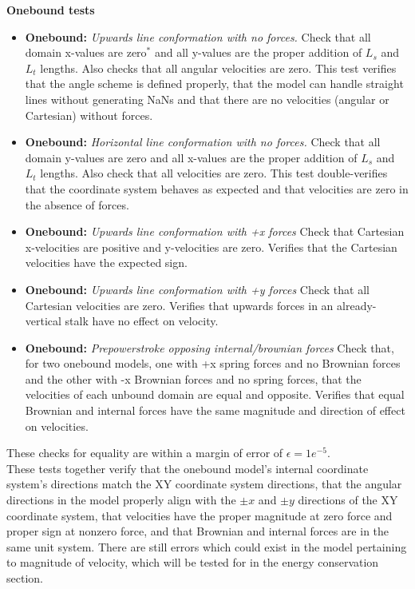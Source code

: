 \documentclass[
11pt, %
english, %
singlespacing, %
headsepline, %
chapterinoneline, %
]{MastersDoctoralThesis} %
\begin{document}
\textbf{Onebound tests}
\begin{itemize}
\item \textbf{Onebound:} \textit{Upwards line conformation with no forces.} Check that all domain x-values are zero$^*$ and all y-values are the proper addition of $L_s$ and $L_t$ lengths. Also checks that all angular velocities are zero. This test verifies that the angle scheme is defined properly, that the model can handle straight lines without generating NaNs and that there are no velocities (angular or Cartesian) without forces.
\item \textbf{Onebound:} \textit{Horizontal line conformation with no forces.} Check that all domain y-values are zero and all x-values are the proper addition of $L_s$ and $L_t$ lengths. Also check that all velocities are zero. This test double-verifies that the coordinate system behaves as expected and that velocities are zero in the absence of forces.
\item \textbf{Onebound:} \textit{Upwards line conformation with +x forces} Check that Cartesian x-velocities are positive and y-velocities are zero. Verifies that the Cartesian velocities have the expected sign.
\item \textbf{Onebound:} \textit{Upwards line conformation with +y forces} Check that all Cartesian velocities are zero. Verifies that upwards forces in an already-vertical stalk have no effect on velocity.
  \item \textbf{Onebound:} \textit{Prepowerstroke opposing internal/brownian forces} Check that, for two onebound models, one with +x spring forces and no Brownian forces and the other with -x Brownian forces and no spring forces, that the velocities of each unbound domain are equal and opposite. Verifies that equal Brownian and internal forces have the same magnitude and direction of effect on velocities.
\end{itemize}

These checks for equality are within a margin of error of $\epsilon = 1e^{-5}$.\\

These tests together verify that the onebound model's internal coordinate system's directions match the XY coordinate system directions, that the angular directions in the model properly align with the $\pm x$ and $\pm y$ directions of the XY coordinate system, that velocities have the proper magnitude at zero force and proper sign at nonzero force, and that Brownian and internal forces are in the same unit system. There are still errors which could exist in the model pertaining to magnitude of velocity, which will be tested for in the energy conservation section.\\
\end{document}
